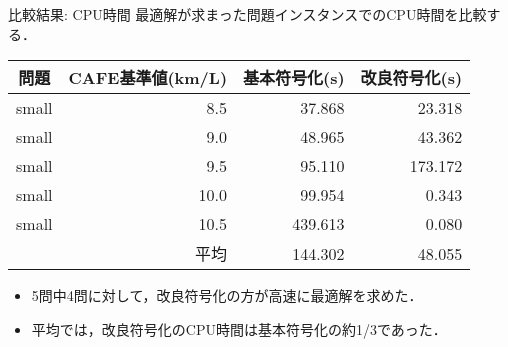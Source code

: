 \documentclass[dvipdfmx, 11pt,]{beamer}
\begin{document}
\begin{frame}{比較結果: CPU時間}
 最適解が求まった問題インスタンスでのCPU時間を比較する．
 \begin{exampleblock}{} \centering 
  \begin{tabular}{crrr}
   問題		& CAFE基準値(km/L)	 & 基本符号化(s)  & 改良符号化(s)   \\\hline
   small 	& 8.5  & 37.868          	& \alert{23.318}          \\
   small	& 9.0  & 48.965          & \alert{43.362}          \\
   small	& 9.5  & \alert{95.110}          & 173.172         \\
   small	& 10.0 & 99.954          & \alert{0.343}           \\
   small	& 10.5 & 439.613         & \alert{0.080}           \\\hline
   \multicolumn{2}{r}{平均}		 & 144.302			& \alert{48.055}
  \end{tabular}
 \end{exampleblock}
 \begin{itemize}
  \item 5問中4問に対して，改良符号化の方が高速に最適解を求めた．
  \item 平均では，改良符号化のCPU時間は基本符号化の約1/3であった．
 \end{itemize}
\end{frame}
\end{document}
